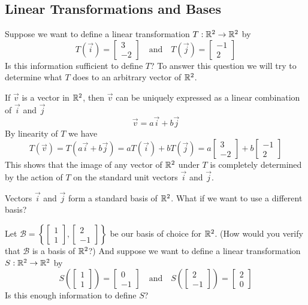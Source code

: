 \documentclass{ximera}
\begin{document}
\subsection*{Linear Transformations and Bases}

\begin{exploration}\label{init:tij}  Suppose we want to define a linear transformation $T:\mathbb{R}^2\rightarrow \mathbb{R}^2$ by $$T(\vec{i})=\begin{bmatrix}3\\-2\end{bmatrix}\quad\text{and}\quad T(\vec{j})=\begin{bmatrix}-1\\2\end{bmatrix}$$  
Is this information sufficient to define $T$?  
To answer this question we will try to determine what $T$ does to an arbitrary vector of $\mathbb{R}^2$.  

If $\vec{v}$ is a vector in $\mathbb{R}^2$, then $\vec{v}$ can be uniquely expressed as a linear combination of $\vec{i}$ and $\vec{j}$
$$\vec{v}=a\vec{i}+b\vec{j}$$  By linearity of $T$ we have $$T(\vec{v})=T(a\vec{i}+b\vec{j})=aT(\vec{i})+bT(\vec{j})=a\begin{bmatrix}3\\-2\end{bmatrix}+b\begin{bmatrix}-1\\2\end{bmatrix}$$
This shows that the image of any vector of $\mathbb{R}^2$ under $T$ is completely determined by the action of $T$ on the standard unit vectors $\vec{i}$ and $\vec{j}$.  

Vectors $\vec{i}$ and $\vec{j}$ form a standard basis of $\mathbb{R}^2$.  What if we want to use a different basis?  

Let $\mathcal{B}=\left\{\begin{bmatrix}1\\1\end{bmatrix},\begin{bmatrix}2\\-1\end{bmatrix}\right\}$ be our basis of choice for $\mathbb{R}^2$. (How would you verify that $\mathcal{B}$ is a basis of $\mathbb{R}^2$?) And suppose we want to define a linear transformation $S:\mathbb{R}^2\rightarrow \mathbb{R}^2$ by $$S\left(\begin{bmatrix}1\\1\end{bmatrix}\right)=\begin{bmatrix}0\\-1\end{bmatrix}\quad\text{and}\quad S\left(\begin{bmatrix}2\\-1\end{bmatrix}\right)=\begin{bmatrix}2\\0\end{bmatrix}$$
Is this enough information to define $S$?


\end{exploration}
\end{document}
